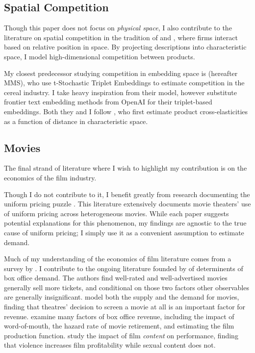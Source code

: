 \documentclass{article}
\begin{document}
\subsection{Spatial Competition}

Though this paper does not focus on \emph{physical space}, I also contribute to the literature on spatial competition in the tradition of \textcite{hotelling1929E} and \textcite{salop1979BE}, where firms interact based on relative position in space. By projecting descriptions into characteristic space, I model high-dimensional competition between products. 

My closest predecessor studying competition in embedding space is \textcite{magnolfi2022} (hereafter MMS), who use t-Stochastic Triplet Embeddings to estimate competition in the cereal industry. I take heavy inspiration from their model, however substitute frontier text embedding methods from OpenAI for their triplet-based embeddings. Both they and I follow \textcite{pinkse2002E}, who first estimate product cross-elasticities as a function of distance in characteristic space.

\subsection{Movies}

The final strand of literature where I wish to highlight my contribution is on the economics of the film industry. 

Though I do not contribute to it, I benefit greatly from research documenting the uniform pricing puzzle \parencite{orbach2007IRLE, gil2009MS, ho2018MR}. This literature extensively documents movie theaters' use of uniform pricing across heterogeneous movies. While each paper suggests potential explanations for this phenomenon, my findings are agnostic to the true cause of uniform pricing; I simply use it as a convenient assumption to estimate demand.

Much of my understanding of the economics of film literature comes from a survey by \textcite{mckenzie2012ES}. I contribute to the ongoing literature founded by \textcite{prag1994CE} of determinents of box office demand. The authors find well-rated and well-advertised movies generally sell more tickets, and conditional on those two factors other observables are generally insignificant. \textcite{elberse2003MS} model both the supply and the demand for movies, finding that theatres' decision to screen a movie at all is an important factor for revenue. \textcite{devany1996E, devany1997EI, devany1999JCE, devany2004EDC} examine many factors of box office revenue, including the impact of word-of-mouth, the hazard rate of movie retirement, and estimating the film production function. \textcite{ravid2004B} study the impact of film \emph{content} on performance, finding that violence increases film profitability while sexual content does not. 
\end{document}
